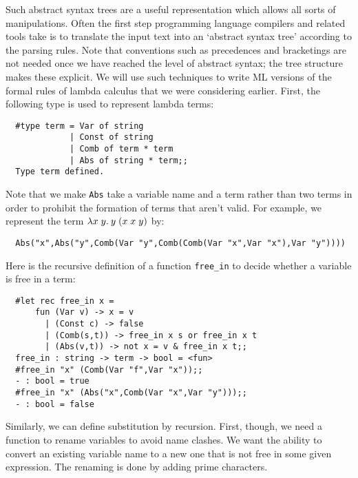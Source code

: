 Such abstract syntax trees are a useful representation which allows all sorts
of manipulations. Often the first step programming language compilers and
related tools take is to translate the input text into an `abstract syntax
tree' according to the parsing rules. Note that conventions such as precedences
and bracketings are not needed once we have reached the level of abstract
syntax; the tree structure makes these explicit. We will use such techniques to
write ML versions of the formal rules of lambda calculus that we were
considering earlier. First, the following type is used to represent lambda
terms:

\begin{boxed}\begin{verbatim}
  #type term = Var of string
             | Const of string
             | Comb of term * term
             | Abs of string * term;;
  Type term defined.
\end{verbatim}\end{boxed}

Note that we make {\tt Abs} take a variable name and a term rather than two
terms in order to prohibit the formation of terms that aren't valid. For
example, we represent the term $\lambda x\; y.\: y\; (x\; x\; y)$ by:

\begin{boxed}\begin{verbatim}
  Abs("x",Abs("y",Comb(Var "y",Comb(Comb(Var "x",Var "x"),Var "y"))))
\end{verbatim}\end{boxed}

Here is the recursive definition of a function {\tt free\_in} to decide whether
a variable is free in a term:

\begin{boxed}\begin{verbatim}
  #let rec free_in x =
      fun (Var v) -> x = v
        | (Const c) -> false
        | (Comb(s,t)) -> free_in x s or free_in x t
        | (Abs(v,t)) -> not x = v & free_in x t;;
  free_in : string -> term -> bool = <fun>
  #free_in "x" (Comb(Var "f",Var "x"));;
  - : bool = true
  #free_in "x" (Abs("x",Comb(Var "x",Var "y")));;
  - : bool = false
\end{verbatim}\end{boxed}

Similarly, we can define substitution by recursion. First, though, we need a
function to rename variables to avoid name clashes. We want the ability to
convert an existing variable name to a new one that is not free in some given
expression. The renaming is done by adding prime characters.

